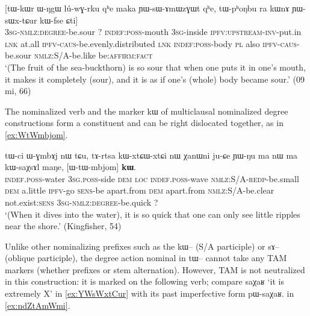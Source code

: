 \documentclass[oldfontcommands,oneside,a4paper,11pt]{article}
\newcommand{\ipa}[1]{{\phon #1}} %
\begin{document}
\begin{exe}
\ex \label{ex:YWsWxtCur2}
\gll 
 	[\ipa{ɯ-tɯ-tɕur}]  	\ipa{\textbf{kɯ}}  	[\ipa{tɯ-kɯr}  	\ipa{ɯ-ŋgɯ}  	\ipa{lú-wɣ-rku}  	\ipa{qʰe}  	\ipa{maka}  	\ipa{ɲɯ-sɯ-ɤmɯzɣɯt}  	\ipa{qʰe,}  	\ipa{tɯ-pʰoŋbu}  	\ipa{ra}  	\ipa{kɯnɤ}  	\ipa{ɲɯ-sɯx-tɕur}  	\ipa{kɯ-fse}  	\ipa{ɕti}]  \\
  \textsc{3sg-nmlz:degree}-be.sour ?{ } \textsc{indef:poss}-mouth \textsc{3sg}-inside \textsc{ipfv:upstream-inv}-put.in \textsc{lnk} at.all \textsc{ipfv-caus}-be.evenly.distributed \textsc{lnk} \textsc{indef:poss}-body \textsc{pl} also \textsc{ipfv-caus}-be.sour \textsc{nmlz:S/A}-be.like be:\textsc{affirm}:\textsc{fact} \\
\glt `(The fruit of the sea-buckthorn) is so sour that when one puts it in one's mouth, it makes it completely (sour), and it is as if one's (whole) body became sour.' (09 mi, 66)
\end{exe}

The nominalized verb and the marker \ipa{kɯ} of multiclausal  nominalized degree constructions form a constituent and can be right dislocated together, as in \ref{ex:WtWmbjom}.

 \begin{exe}
\ex \label{ex:WtWmbjom}
\gll 
\ipa{tɯ-ci}  	\ipa{ɯ-ɣmbɤj}  	\ipa{nɯ}  	\ipa{tɕu,}  	  	\ipa{tɤ-rtsa}  	\ipa{kɯ-xtɕɯ-xtɕi}  	\ipa{nɯ}  	\ipa{χanɯni}  	\ipa{ju-ɕe}  	\ipa{ɲɯ-ŋu}  	\ipa{ma}  	\ipa{nɯ}  	\ipa{ma}  	\ipa{kɯ-saχsɤl}  	\ipa{maŋe,}  	[\ipa{ɯ-tɯ-mbjom}]  	\ipa{\textbf{kɯ}.}  \\
\textsc{indef.poss}-water \textsc{3sg.poss}-side \textsc{dem} \textsc{loc} \textsc{indef.poss}-wave \textsc{nmlz:S/A-redp}-be.small \textsc{dem} a.little \textsc{ipfv}-go \textsc{sens}-be apart.from \textsc{dem} apart.from   \textsc{nmlz:S/A}-be.clear not.exist:\textsc{sens} \textsc{3sg-nmlz:degree}-be.quick ?{ } \\
\glt `(When it dives into the water), it is so quick that one can only see little ripples near the shore.'
 (Kingfisher, 54)
\end{exe}

Unlike other nominalizing prefixes such as the \ipa{kɯ--} (S/A participle) or \ipa{sɤ--} (oblique participle), the degree action nominal in \ipa{tɯ--} cannot take any TAM markers (whether prefixes or stem alternation). However, TAM is not neutralized in this construction: it is marked on the following verb; compare \ipa{saχaʁ} `it is extremely X' in \ref{ex:YWsWxtCur} with its past imperfective form \ipa{pɯ-saχaʁ}.
in \ref{ex:ndZtAmWmi}.
\end{document}
